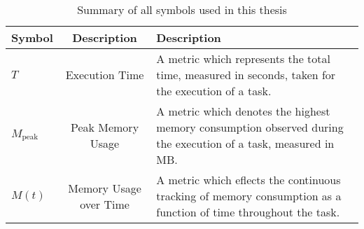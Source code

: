
\newcommand{\T}{$T$}
\newcommand{\Mpeak}{$M_{\text{peak}}$}
\newcommand{\Mt}{$M(t)$}

\begin{table}[h]
    \centering
    \begin{tabular}{|l|c|p{5cm}|}
        \hline
        \textbf{Symbol} & \textbf{Description}   & \textbf{Description}                                                                                                \\ \hline
        \T              & Execution Time         & A metric which represents the total time, measured in seconds, taken for the execution of a task.                   \\ \hline
        \Mpeak          & Peak Memory Usage      & A metric which denotes the highest memory consumption observed during the execution of a task, measured in \ac{MB}. \\ \hline
        \Mt             & Memory Usage over Time & A metric which eflects the continuous tracking of memory consumption as a function of time throughout the task.     \\ \hline
    \end{tabular}
    \caption{Summary of all symbols used in this thesis }
    \label{tab:summary-of-symbols}
\end{table}